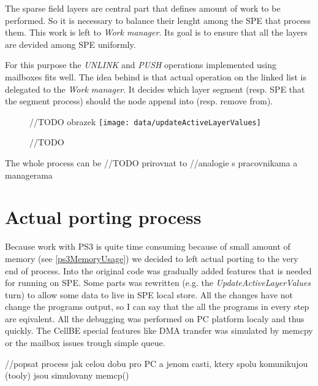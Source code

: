 The sparse field layers are central part that defines amount of work to be performed.
So it is necessary to balance their lenght among the SPE that process them.
This work is left to \emph{Work manager}.
Its goal is to ensure that all the layers are devided among SPE uniformly.

For this purpose the \emph{UNLINK} and \emph{PUSH} operations implemented using mailboxes fits well.
The idea behind is that actual operation on the linked list is delegated to the \emph{Work manager}.
It decides which layer segment (resp. SPE that the segment process) should the node append into (resp. remove from).

\begin{figure}	//TODO obrazek
    \centering
    \texttt{[image: data/updateActiveLayerValues]}
    \caption[Diagram of new design components]{//TODO}
    \label{fg:updateActiveLayerValues}
\end{figure}

The whole process can be //TODO prirovnat to
//analogie s pracovnikama a managerama

\section{Actual porting process}

Because work with PS3 is quite time consuming because of small amount of memory (see \ref{ps3MemoryUsage}) we decided to left actual porting to the very end of process.
Into the original code was gradually added features that is needed for running on SPE.
Some parts was rewritten (e.g. the \emph{UpdateActiveLayerValues} turn) to allow some data to live in SPE local store.
All the changes have not change the programs output, so I can say that the all the programs in every step are eqivalent.
All the debugging was performed on PC platform localy and thus quickly.
The CellBE special features like DMA transfer was simulated by memcpy or the mailbox issues trough simple queue.



//popsat process jak celou dobu pro PC a jenom casti, ktery spolu komunikujou (tooly) jsou simulovany memcp()